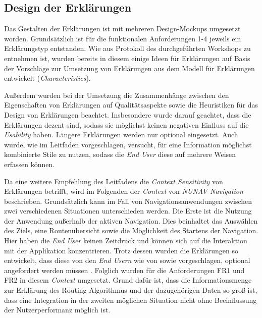 \subsection{Design der Erklärungen}
\label{sec:explanation_design}

Das Gestalten der Erklärungen ist mit mehreren Design-Mockups umgesetzt worden. Grundsätzlich ist für die funktionalen Anforderungen 1-4 jeweils ein Erklärungstyp entstanden. Wie aus Protokoll des durchgeführten Workshops zu entnehmen ist, wurden bereits in diesem einige Ideen für Erklärungen auf Basis der Vorschläge zur Umsetzung von Erklärungen aus dem Modell für Erklärungen entwickelt (\textit{Characteristics}).

Außerdem wurden bei der Umsetzung die Zusammenhänge zwischen den Eigenschaften von Erklärungen auf Qualitätsaspekte sowie die Heuristiken für das Design von Erklärungen beachtet. Insbesondere wurde darauf geachtet, dass die Erklärungen dezent sind, sodass sie möglichst keinen negativen Einfluss auf die \textit{Usability} haben. Längere Erklärungen werden nur optional eingesetzt. Auch wurde, wie im Leitfaden vorgeschlagen, versucht, für eine Information möglichst kombinierte Stile zu nutzen, sodass die \textit{End User} diese auf mehrere Weisen erfassen können.

Da eine weitere Empfehlung des Leitfadens die \textit{Context Sensitivity} von Erklärungen betrifft, wird im Folgenden der \textit{Context} von \textit{NUNAV Navigation} beschrieben.
Grundsätzlich kann im Fall von Navigationsanwendungen zwischen zwei verschiedenen Situationen unterschieden werden. Die Erste ist die Nutzung der Anwendung außerhalb der aktiven Navigation. Dies beinhaltet das Auswählen des Ziels, eine Routenübersicht sowie die Möglichkeit des Startens der Navigation. Hier haben die \textit{End User} keinen Zeitdruck und können sich auf die Interaktion mit der Applikation konzentrieren. Trotz dessen wurden die Erklärungen so entwickelt, dass diese von den \textit{End Usern} wie von \citeauthor{chazette_end-users_nodate} sowie \citeauthor{wang_integration_2020} vorgeschlagen, optional angefordert werden müssen \cite{chazette_end-users_nodate,wang_integration_2020}. Folglich wurden für die Anforderungen FR1 und FR2 in diesem \textit{Context} umgesetzt. Grund dafür ist, dass die Informationsmenge zur Erklärung des Routing-Algorithmus und der dazugehörigen Daten so groß ist, dass eine Integration in der zweiten möglichen Situation nicht ohne Beeinflussung der Nutzerperformanz möglich ist.


